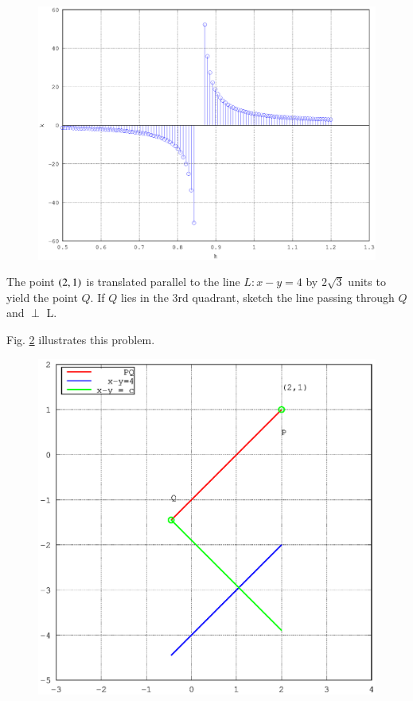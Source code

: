 \documentclass[journal,12pt,twocolumn]{IEEEtran}
\begin{document}
\begin{figure}
\begin{center}
\includegraphics[width=\columnwidth]{./figs/ee16b1009}
\end{center}
\label{fig_9}	
\end{figure}
%
\begin{problem}
The point $\left(2,1\right)$ is translated parallel to the line $L:x-y=4$ by $2\sqrt{3}$ units to yield the point $Q$.  If $Q$ lies in the 3rd quadrant, 
sketch the line passing through $Q$ and $\perp$ L.
\end{problem}
%
\solution

Fig. \ref{fig_10} illustrates this problem.

\begin{figure}
\begin{center}
\includegraphics[width=\columnwidth]{./figs/ee16b1010}
\end{center}
\label{fig_10}	
\end{figure}
%
\end{document}
